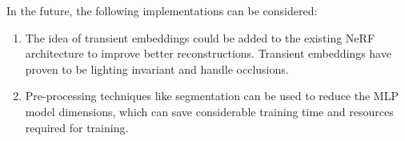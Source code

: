 \documentclass[conference]{IEEEtran}
\begin{document}
In the future, the following implementations can be considered:

\begin{enumerate}
\item The idea of transient embeddings \cite{nerf_w} could be added to the existing NeRF architecture to improve better reconstructions. Transient embeddings have proven to be lighting invariant and handle occlusions.
\item Pre-processing techniques like segmentation can be used to reduce the MLP model dimensions, which can save considerable training time and resources required for training.
\end{enumerate}




\end{document}
